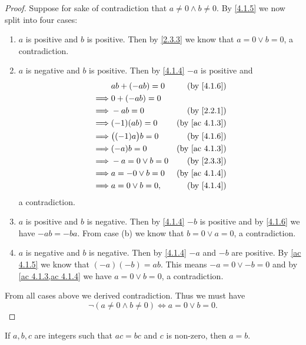 \begin{proof}
  Suppose for sake of contradiction that \(a \neq 0 \land b \neq 0\).
  By \cref{4.1.5} we now split into four cases:
  \begin{enumerate}
    \item \(a\) is positive and \(b\) is positive.
          Then by \cref{2.3.3} we know that \(a = 0 \lor b = 0\), a contradiction.
    \item \(a\) is negative and \(b\) is positive.
          Then by \cref{4.1.4} \(-a\) is positive and
          \begin{align*}
                     & ab + (-ab) = 0       & \text{(by \cref{4.1.6})}    \\
            \implies & 0 + (-ab) = 0                                      \\
            \implies & -ab = 0              & \text{(by \cref{2.2.1})}    \\
            \implies & (-1)(ab) = 0         & \text{(by \cref{ac 4.1.3})} \\
            \implies & \big((-1)a\big)b = 0 & \text{(by \cref{4.1.6})}    \\
            \implies & (-a)b = 0            & \text{(by \cref{ac 4.1.3})} \\
            \implies & -a = 0 \lor b = 0    & \text{(by \cref{2.3.3})}    \\
            \implies & a = -0 \lor b = 0    & \text{(by \cref{ac 4.1.4})} \\
            \implies & a = 0 \lor b = 0,    & \text{(by \cref{4.1.4})}
          \end{align*}
          a contradiction.
    \item \(a\) is positive and \(b\) is negative.
          Then by \cref{4.1.4} \(-b\) is positive and by \cref{4.1.6} we have \(-ab = -ba\).
          From case (b) we know that \(b = 0 \lor a = 0\), a contradiction.
    \item \(a\) is negative and \(b\) is negative.
          Then by \cref{4.1.4} \(-a\) and \(-b\) are positive.
          By \cref{ac 4.1.5} we know that \((-a)(-b) = ab\).
          This means \(-a = 0 \lor -b = 0\) and by \cref{ac 4.1.3,ac 4.1.4} we have \(a = 0 \lor b = 0\), a contradiction.
  \end{enumerate}
  From all cases above we derived contradiction.
  Thus we must have
  \[
    \lnot(a \neq 0 \land b \neq 0) \iff a = 0 \lor b = 0.
  \]
\end{proof}

\begin{corollary}\label{4.1.9}
  If \(a, b, c\) are integers such that \(ac = bc\) and \(c\) is non-zero, then \(a = b\).
\end{corollary}

